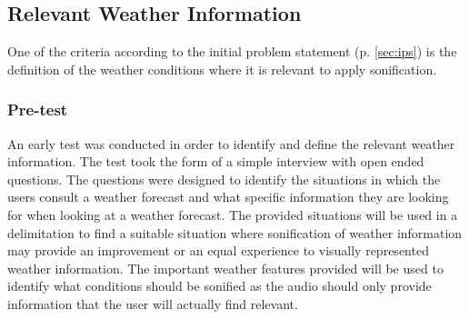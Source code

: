 \subsection{Relevant Weather Information} \label{sec:relevantweatherinformation}
One of the criteria according to the initial problem statement (p. \ref{sec:ips}) is the definition of the weather conditions where it is relevant to apply sonification.

\subsubsection{Pre-test} \label{sec:pretest} 
An early test was conducted in order to identify and define the relevant weather information. 
The test took the form of a simple interview with open ended questions.
The questions were designed to identify the situations in which the users consult a weather forecast and what specific information they are looking for when looking at a weather forecast.
The provided situations will be used in a delimitation to find a suitable situation where sonification of weather information may provide an improvement or an equal experience to visually represented weather information.
The important weather features provided will be used to identify what conditions should be sonified as the audio should only provide information that the user will actually find relevant.